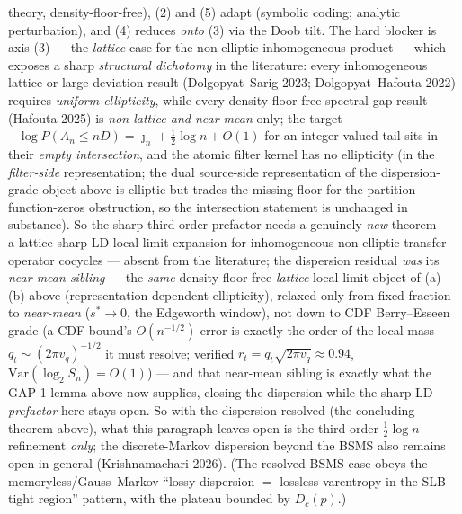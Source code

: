 \documentclass[
]{article}
\begin{document}
theory, density-floor-free), (2) and (5) adapt (symbolic coding; analytic perturbation), and (4)
reduces \emph{onto} (3) via the Doob tilt. The hard blocker is axis (3) --- the \emph{lattice} case
for the non-elliptic inhomogeneous product --- which exposes a sharp \emph{structural dichotomy} in
the literature: every inhomogeneous lattice-or-large-deviation result (Dolgopyat--Sarig 2023;
Dolgopyat--Hafouta 2022) requires \emph{uniform ellipticity}, while every density-floor-free
spectral-gap result (Hafouta 2025) is \emph{non-lattice and near-mean} only; the target
$-\log P(A_n\le nD)=\jmath_n+\tfrac12\log n+O(1)$ for an integer-valued tail sits in their
\emph{empty intersection}, and the atomic filter kernel has no ellipticity (in the \emph{filter-side}
representation; the dual source-side representation of the dispersion-grade object above is elliptic
but trades the missing floor for the partition-function-zeros obstruction, so the intersection
statement is unchanged in substance). So the sharp third-order prefactor needs a
genuinely \emph{new} theorem --- a lattice sharp-LD local-limit expansion for inhomogeneous
non-elliptic transfer-operator cocycles --- absent from the literature; the dispersion residual
\emph{was} its
\emph{near-mean sibling} --- the \emph{same} density-floor-free \emph{lattice}
local-limit object of (a)--(b) above (representation-dependent ellipticity), relaxed only from
fixed-fraction to \emph{near-mean} ($s^*\to0$,
the Edgeworth window), not down to CDF Berry--Esseen grade (a CDF bound's $O(n^{-1/2})$ error is exactly
the order of the local mass $q_t\sim(2\pi v_q)^{-1/2}$ it must resolve; verified
$r_t=q_t\sqrt{2\pi v_q}\approx0.94$, $\mathrm{Var}(\log_2 S_n)=O(1)$) --- and that near-mean sibling is
exactly what the GAP-1 lemma above now supplies, closing the dispersion while the sharp-LD
\emph{prefactor} here stays open. So with the dispersion resolved (the concluding theorem above), what
this paragraph leaves open is the third-order $\tfrac12\log n$ refinement \emph{only}; the
discrete-Markov dispersion beyond the BSMS also remains open in general (Krishnamachari 2026). (The
resolved BSMS case obeys the
memoryless/Gauss--Markov ``lossy dispersion $=$ lossless varentropy in the SLB-tight region'' pattern,
with the plateau bounded by $D_c(p)$.)
\end{document}

